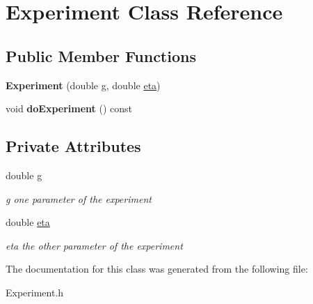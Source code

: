 \hypertarget{classExperiment}{\section{Experiment Class Reference}
\label{classExperiment}
}
\subsection*{Public Member Functions}
\begin{DoxyCompactItemize}
\item 
\hypertarget{classExperiment_a9f2a5806ff49b9cb5cb64116d308e7cd}{{\bfseries Experiment} (double \hyperlink{classExperiment_a465c0084fd487ceabaeef546f0a419e5}{g}, double \hyperlink{classExperiment_a958e9e5263561bfeae89bbaf3d1fff67}{eta})}\label{classExperiment_a9f2a5806ff49b9cb5cb64116d308e7cd}

\item 
\hypertarget{classExperiment_a0c6f9b9e73da008eddb28843047455fa}{void {\bfseries do\-Experiment} () const }\label{classExperiment_a0c6f9b9e73da008eddb28843047455fa}

\end{DoxyCompactItemize}
\subsection*{Private Attributes}
\begin{DoxyCompactItemize}
\item 
\hypertarget{classExperiment_a465c0084fd487ceabaeef546f0a419e5}{double \hyperlink{classExperiment_a465c0084fd487ceabaeef546f0a419e5}{g}}\label{classExperiment_a465c0084fd487ceabaeef546f0a419e5}

\begin{DoxyCompactList}\small\item\em g one parameter of the experiment \end{DoxyCompactList}\item 
\hypertarget{classExperiment_a958e9e5263561bfeae89bbaf3d1fff67}{double \hyperlink{classExperiment_a958e9e5263561bfeae89bbaf3d1fff67}{eta}}\label{classExperiment_a958e9e5263561bfeae89bbaf3d1fff67}

\begin{DoxyCompactList}\small\item\em eta the other parameter of the experiment \end{DoxyCompactList}\end{DoxyCompactItemize}


The documentation for this class was generated from the following file\-:\begin{DoxyCompactItemize}
\item 
Experiment.\-h\end{DoxyCompactItemize}
